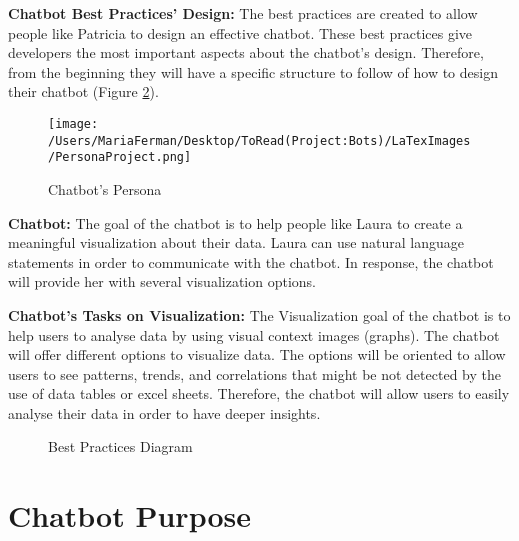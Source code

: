 \documentclass[a4paper,10pt]{article}
\begin{document}
\textbf{Chatbot Best Practices' Design:} The best practices are created to allow people like Patricia to design an effective chatbot. These best practices give developers the most important aspects about the chatbot's design. Therefore, from the beginning they will have a specific structure to follow of how to design their chatbot (Figure \ref{FigureBestPracticeDiagram}). 

\begin{figure}
\centering
\texttt{[image: /Users/MariaFerman/Desktop/ToRead(Project:Bots)/LaTexImages/PersonaProject.png]}
\caption{Chatbot's Persona}
\label{FigureLaura}
\end{figure}

\textbf{Chatbot:} The goal of the chatbot is to help people like Laura to create a meaningful visualization about their data. Laura can use natural language statements in order to communicate with the chatbot. In response, the chatbot will provide her with several visualization options.

\textbf{Chatbot's Tasks on Visualization:} The Visualization goal of the chatbot is to help users to analyse data by using visual context images (graphs). The chatbot will offer different options to visualize data. The options will be oriented to allow users to see patterns, trends, and correlations that might be not detected by the use of data tables or excel sheets. Therefore, the chatbot will allow users to easily analyse their data in order to have deeper insights.  

\begin{figure}[p]
    \caption{Best Practices Diagram}
    \label{FigureBestPracticeDiagram}
\end{figure}

\newpage

\section{Chatbot Purpose}
\end{document}
